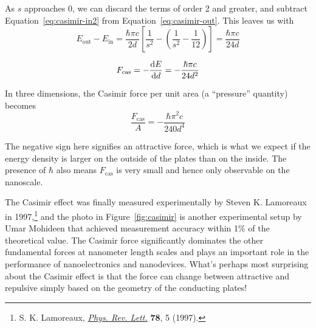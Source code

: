 As $s$ approaches 0, we can discard the terms of order 2 and greater, and subtract Equation~\ref{eq:casimir-in2} from Equation~\ref{eq:casimir-out}. This leaves us with 
\begin{equation*}
	E_{\text{out}} - E_{\text{in}} = \frac{\hbar \pi c}{2d} \left[ \frac{1}{s^2} - \left( \frac{1}{s^2} - \frac{1}{12} \right) \right] = \frac{\hbar \pi c}{24d}
\end{equation*}

\begin{tcolorbox}[title=Casimir force in one dimension] \vspace{-2ex}
	\begin{equation}
		F_{\text{cas}} = -\dv{E}{d} = -\frac{\hbar \pi c}{24d^2}
	\end{equation}
\end{tcolorbox}

In three dimensions, the Casimir force per unit area (a ``pressure'' quantity) becomes 
\begin{equation*}
	\frac{F_{\text{cas}}}{A} = -\frac{\hbar\pi^2c}{240d^4}
\end{equation*}

The negative sign here signifies an attractive force, which is what we expect if the energy density is larger on the outside of the plates than on the inside. The presence of $\hbar$ also means $F_{\text{cas}}$ is very small and hence only observable on the nanoscale. \par 

The Casimir effect was finally measured experimentally by Steven K. Lamoreaux in 1997,\footnote{S. K. Lamoreaux, \href{https://journals.aps.org/prl/abstract/10.1103/PhysRevLett.78.5}{\emph{Phys. Rev. Lett.}} \textbf{78}, 5 (1997).} and the photo in Figure~\ref{fig:casimir} is another experimental setup by Umar Mohideen that achieved measurement accuracy within 1\% of the theoretical value. The Casimir force significantly dominates the other fundamental forces at nanometer length scales and plays an important role in the performance of nanoelectronics and nanodevices. What's perhaps most surprising about the Casimir effect is that the force can change between attractive and repulsive simply based on the geometry of the conducting plates! \par


